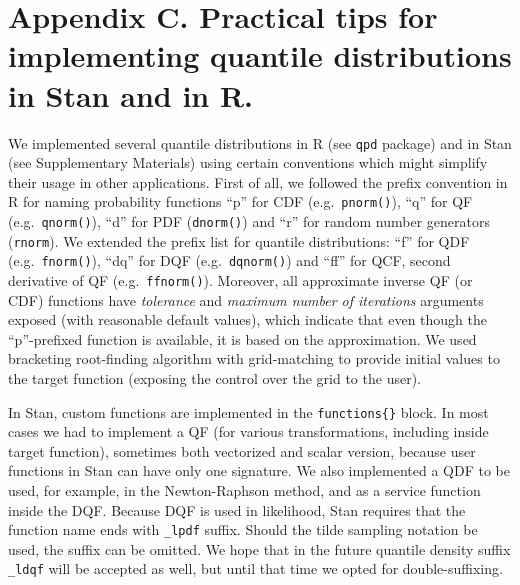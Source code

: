 \documentclass[
  12pt,
]{article}
\begin{document}
\hypertarget{appendix-c.-practical-tips-for-implementing-quantile-distributions-in-stan-and-in-r.}{%
\section*{Appendix C. Practical tips for implementing quantile distributions in Stan and in R.}\label{appendix-c.-practical-tips-for-implementing-quantile-distributions-in-stan-and-in-r.}}

We implemented several quantile distributions in R (see \texttt{qpd} package) and in Stan (see Supplementary Materials) using certain conventions which might simplify their usage in other applications. First of all, we followed the prefix convention in R for naming probability functions ``p'' for CDF (e.g.~\texttt{pnorm()}), ``q'' for QF (e.g.~\texttt{qnorm()}), ``d'' for PDF (\texttt{dnorm()}) and ``r'' for random number generators (\texttt{rnorm}). We extended the prefix list for quantile distributions: ``f'' for QDF (e.g.~\texttt{fnorm()}), ``dq'' for DQF (e.g.~\texttt{dqnorm()}) and ``ff'' for QCF, second derivative of QF (e.g.~\texttt{ffnorm()}). Moreover, all approximate inverse QF (or CDF) functions have \emph{tolerance} and \emph{maximum number of iterations} arguments exposed (with reasonable default values), which indicate that even though the ``p''-prefixed function is available, it is based on the approximation. We used bracketing root-finding algorithm with grid-matching to provide initial values to the target function (exposing the control over the grid to the user).

In Stan, custom functions are implemented in the \texttt{functions\{\}} block. In most cases we had to implement a QF (for various transformations, including inside target function), sometimes both vectorized and scalar version, because user functions in Stan can have only one signature. We also implemented a QDF to be used, for example, in the Newton-Raphson method, and as a service function inside the DQF. Because DQF is used in likelihood, Stan requires that the function name ends with \texttt{\_lpdf} suffix. Should the tilde sampling notation be used, the suffix can be omitted. We hope that in the future quantile density suffix \texttt{\_ldqf} will be accepted as well, but until that time we opted for double-suffixing.
\end{document}
